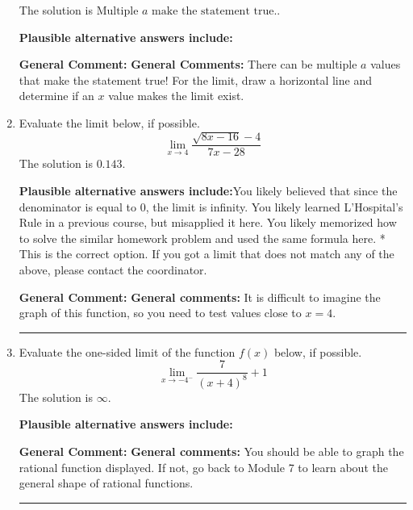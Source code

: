 \documentclass{extbook}[14pt]
\newcommand{\litem}[1]{\item #1

\rule{\textwidth}{0.4pt}}
\begin{document}
\begin{enumerate}
{The solution is \( \text{Multiple } a \text{ make the statement true}. \).\begin{enumerate}[label=\Alph*.]
\textbf{Plausible alternative answers include:}




\end{enumerate}

\textbf{General Comment:} \textbf{General Comments:} There can be multiple $a$ values that make the statement true! For the limit, draw a horizontal line and determine if an $x$ value makes the limit exist.
}
\litem{
Evaluate the limit below, if possible.
\[ \lim_{x \rightarrow 4} \frac{\sqrt{8x - 16} - 4}{7x - 28} \]The solution is \( 0.143 \).\begin{enumerate}[label=\Alph*.]
\textbf{Plausible alternative answers include:}You likely believed that since the denominator is equal to 0, the limit is infinity.
You likely learned L'Hospital's Rule in a previous course, but misapplied it here.
You likely memorized how to solve the similar homework problem and used the same formula here.
* This is the correct option.
If you got a limit that does not match any of the above, please contact the coordinator.
\end{enumerate}

\textbf{General Comment:} \textbf{General comments:} It is difficult to imagine the graph of this function, so you need to test values close to $x = 4$.
}
\litem{
Evaluate the one-sided limit of the function $f(x)$ below, if possible.
\[ \lim_{x \rightarrow -4^-} \frac{7}{(x+4)^8}+1 \]The solution is \( \infty \).\begin{enumerate}[label=\Alph*.]
\textbf{Plausible alternative answers include:}




\end{enumerate}

\textbf{General Comment:} \textbf{General comments:} You should be able to graph the rational function displayed. If not, go back to Module 7 to learn about the general shape of rational functions.
}
\end{enumerate}
\end{document}
